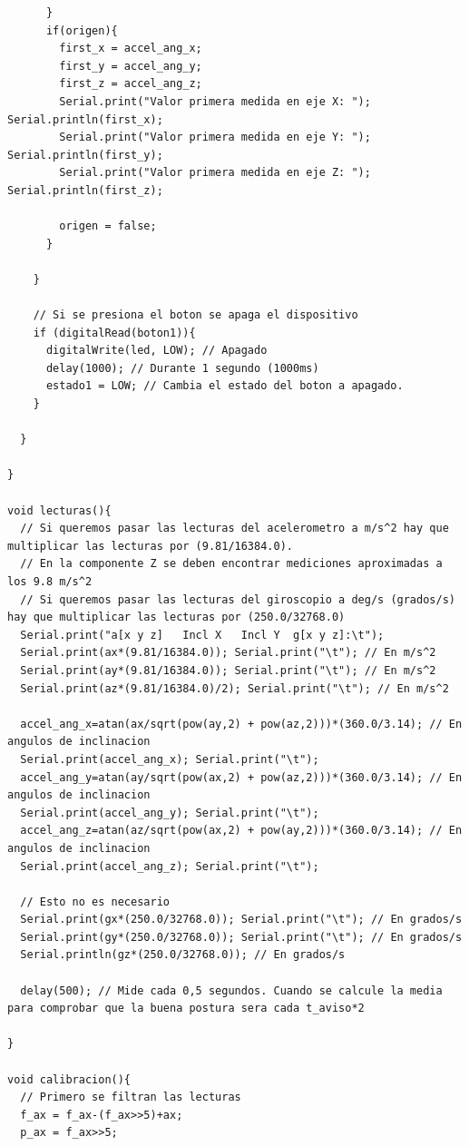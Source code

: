 \begin{lstlisting}
      }
      if(origen){
        first_x = accel_ang_x;
        first_y = accel_ang_y;
        first_z = accel_ang_z;
        Serial.print("Valor primera medida en eje X: "); Serial.println(first_x);
        Serial.print("Valor primera medida en eje Y: "); Serial.println(first_y);
        Serial.print("Valor primera medida en eje Z: "); Serial.println(first_z);

        origen = false;
      }

    } 

    // Si se presiona el boton se apaga el dispositivo
    if (digitalRead(boton1)){
      digitalWrite(led, LOW); // Apagado
      delay(1000); // Durante 1 segundo (1000ms)
      estado1 = LOW; // Cambia el estado del boton a apagado.
    }
    
  }

}

void lecturas(){
  // Si queremos pasar las lecturas del acelerometro a m/s^2 hay que multiplicar las lecturas por (9.81/16384.0). 
  // En la componente Z se deben encontrar mediciones aproximadas a los 9.8 m/s^2 
  // Si queremos pasar las lecturas del giroscopio a deg/s (grados/s) hay que multiplicar las lecturas por (250.0/32768.0) 
  Serial.print("a[x y z]   Incl X   Incl Y  g[x y z]:\t"); 
  Serial.print(ax*(9.81/16384.0)); Serial.print("\t"); // En m/s^2
  Serial.print(ay*(9.81/16384.0)); Serial.print("\t"); // En m/s^2
  Serial.print(az*(9.81/16384.0)/2); Serial.print("\t"); // En m/s^2

  accel_ang_x=atan(ax/sqrt(pow(ay,2) + pow(az,2)))*(360.0/3.14); // En angulos de inclinacion
  Serial.print(accel_ang_x); Serial.print("\t"); 
  accel_ang_y=atan(ay/sqrt(pow(ax,2) + pow(az,2)))*(360.0/3.14); // En angulos de inclinacion
  Serial.print(accel_ang_y); Serial.print("\t"); 
  accel_ang_z=atan(az/sqrt(pow(ax,2) + pow(ay,2)))*(360.0/3.14); // En angulos de inclinacion
  Serial.print(accel_ang_z); Serial.print("\t"); 
  
  // Esto no es necesario
  Serial.print(gx*(250.0/32768.0)); Serial.print("\t"); // En grados/s
  Serial.print(gy*(250.0/32768.0)); Serial.print("\t"); // En grados/s 
  Serial.println(gz*(250.0/32768.0)); // En grados/s

  delay(500); // Mide cada 0,5 segundos. Cuando se calcule la media para comprobar que la buena postura sera cada t_aviso*2

}

void calibracion(){
  // Primero se filtran las lecturas
  f_ax = f_ax-(f_ax>>5)+ax; 
  p_ax = f_ax>>5; 


\end{lstlisting}

